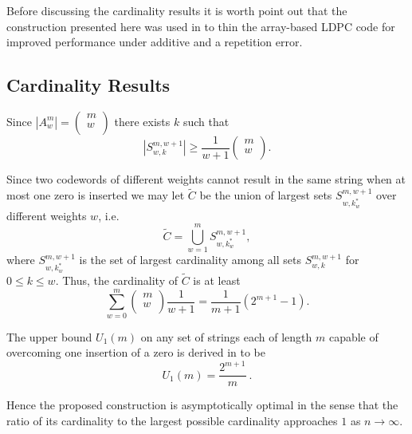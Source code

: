 Before discussing the cardinality results it is worth point out that
the construction presented here was used in \cite{isit06} to thin
the array-based LDPC code for improved performance under additive
and a repetition error.
\subsection{Cardinality Results}
\vspace{0.2in} Since $|A_w^m| = \left( \begin{array}{c}
                             m \\
                             w \\
                           \end{array}
                           \right)$ there exists $k$ such that
                           \[|S_{w,k}^{m,w+1} | \geq \frac{1}{w+1}
\left( \begin{array}{c}
                             m \\
                             w \\
                           \end{array}
                           \right).\]

Since two codewords of different weights cannot result in the same
string when at most one zero is inserted we may let $\tilde{C}$ be
the union of largest sets $S_{w,k^*_w}^{m,w+1}$ over different
weights $w$, i.e. \[\tilde{C}=\bigcup_{w=1}^{m}
S_{w,k^*_w}^{m,w+1},\] where $S_{w,k^*_w}^{m,w+1}$ is the set of
largest cardinality among all sets $S_{w,k}^{m,w+1}$ for $0\leq
k\leq w$. Thus, the cardinality of $\tilde{C}$ is at least
\[\sum_{w=0}^m \left(
\begin{array}{c}
                             m \\
                             w \\
                           \end{array}
                           \right) \frac{1}{w+1}=\frac{1}{m+1}
                           \left(2^{m+1}-1\right).\]

The upper bound $U_1(m)$ on any set of strings each of length $m$
capable of overcoming one insertion of a zero is derived in
\cite{lev:66a} to be
\begin{equation}\label{ub0}U_1(m)=\frac{2^{m+1}}{m}~.\end{equation}

Hence the proposed construction is asymptotically optimal in the
sense that the ratio of its cardinality to the largest possible
cardinality approaches $1$ as $n \rightarrow \infty$.

